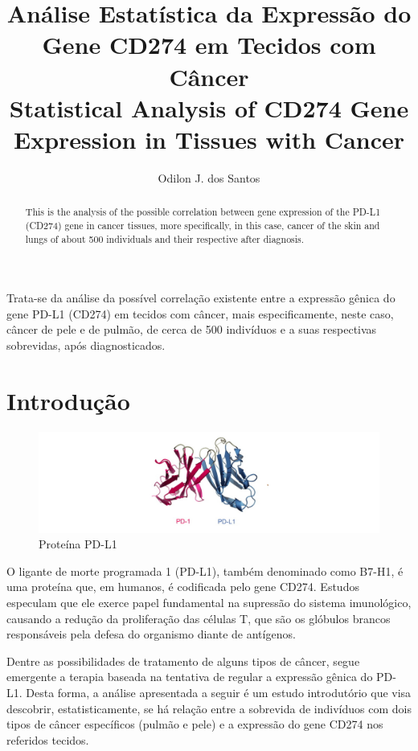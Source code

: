 \documentclass[a4paper,12pt]{article}
\title{Análise Estatística da Expressão do Gene CD274 em Tecidos com Câncer\\
Statistical Analysis of CD274 Gene Expression in Tissues with Cancer}
\author{Odilon J. dos Santos\inst{1}}
\begin{document}
 

\maketitle

\begin{abstract}
  This is the analysis of the possible correlation between gene expression
  of the PD-L1 (CD274) gene in cancer tissues, more specifically, in this case,
  cancer of the skin and lungs of about 500 individuals and their respective
  after diagnosis.
\end{abstract}
     
\begin{resumo} 
 Trata-se da análise da possível correlação existente entre a expressão gênica
 do gene PD-L1 (CD274) em tecidos com câncer, mais especificamente, neste caso,
 câncer de pele e de pulmão, de cerca de 500 indivíduos e a suas respectivas 
 sobrevidas, após diagnosticados. 
\end{resumo}


\section{Introdução} \label{sec:firstpage}

\begin{figure}[h!]
\centering
\includegraphics[width=1 \textwidth]{pdl1.jpg}
\caption{Proteína PD-L1}
\label{fig:PD-L1}
\end{figure}

O ligante de morte programada 1 (PD-L1), também denominado como B7-H1, é uma
proteína que, em humanos, é codificada pelo gene CD274. Estudos especulam que 
ele exerce papel fundamental na supressão do sistema imunológico, causando a redução
da proliferação das células T, que são os glóbulos brancos responsáveis pela defesa
do organismo diante de antígenos.

Dentre as possibilidades de tratamento de alguns tipos de câncer, segue emergente
a terapia baseada na tentativa de regular a expressão gênica do PD-L1. Desta forma, 
a análise apresentada a seguir é um estudo introdutório que visa descobrir, estatisticamente,
 se há relação entre a sobrevida de indivíduos com dois tipos de câncer específicos 
 (pulmão e pele) e a expressão do gene CD274 nos referidos tecidos.
\end{document}

